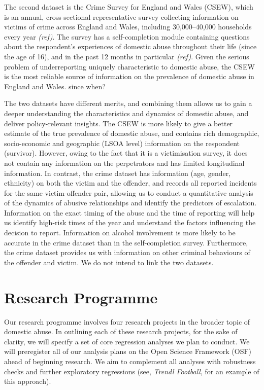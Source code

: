 \documentclass[11pt, a4paper]{article}
\begin{document}
The second dataset is the Crime Survey for England and Wales (CSEW), which is an annual, cross-sectional representative survey collecting information on victims of crime across England and Wales, including 30,000--40,000 households every year \textit{(ref)}. The survey has a self-completion module containing questions about the respondent's experiences of domestic abuse throughout their life (since the age of 16), and in the past 12 months in particular \textit{(ref)}. Given the serious problem of underreporting uniquely characteristic to domestic abuse, the CSEW is the most reliable source of information on the prevalence of domestic abuse in England and Wales.   since when?

The two datasets have different merits, and combining them allows us to gain a deeper understanding the characteristics and dynamics of domestic abuse, and deliver policy-relevant insights. The CSEW is more likely to give a better estimate of the true prevalence of domestic abuse, and contains rich demographic, socio-economic and geographic (LSOA level) information on the respondent (survivor). However, owing to the fact that it is a victimisation survey, it does not contain any information on the perpetrators and has limited longitudinal information. In contrast, the crime dataset has information (age, gender, ethnicity) on both the victim and the offender, and records all reported incidents for the same victim-offender pair, allowing us to conduct a quantitative analysis of the dynamics of abusive relationships and identify the predictors of escalation. Information on the exact timing of the abuse and the time of reporting will help us identify high-risk times of the year and understand the factors influencing the decision to report. Information on alcohol involvement is more likely to be accurate in the crime dataset than in the self-completion survey. Furthermore, the crime dataset provides us with information on other criminal behaviours of the offender and victim. We do not intend to link the two datasets.

\newpage

\section*{Research Programme}

Our research programme involves four research projects in the broader topic of domestic abuse. In outlining each of these research projects, for the sake of clarity, we will specify a set of core regression analyses we plan to conduct. We will preregister all of our analysis plans on the Open Science Framework (OSF) ahead of beginning research. We aim to complement all analyses with robustness checks and further exploratory regressions (see, \textit{Trendl Football}, for an example of this approach).  
\end{document}
